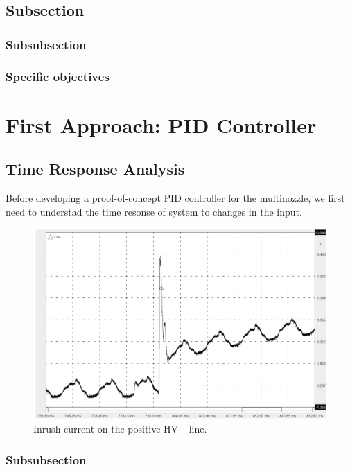 \documentclass[oneside,12pt]{article}
\begin{document}
\subsection{Subsection}
\subsubsection{Subsubsection}

\blindtext %


\subsubsection{Specific objectives}
\blindtext %


\section{First Approach: PID Controller}

\subsection{Time Response Analysis}

Before developing a proof-of-concept PID controller for the multinozzle, we first 
need to understad the time resonse of system to changes in the input.

\begin{figure}[h!]
    \centering
    \includegraphics[width=.8\textwidth,trim=1 1 1 1,clip]{figures/inrush-current.png}
    \caption{Inrush current on the positive HV+ line.}
    \label{fig:inrush-current}
\end{figure}

\subsubsection{Subsubsection}
\end{document}
